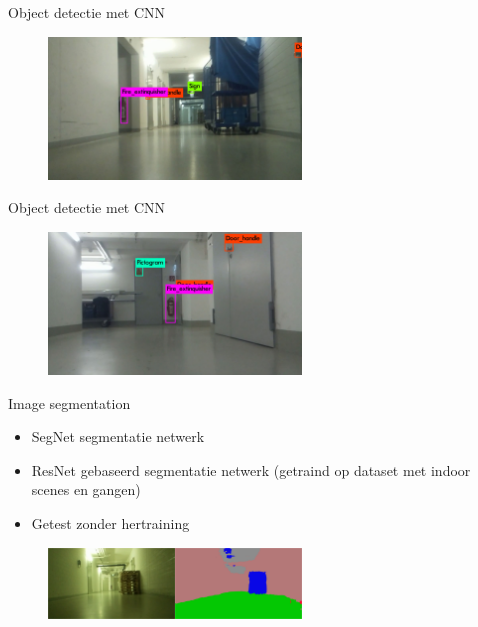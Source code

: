 \documentclass[11pt,t]{beamer}
\begin{document}
\begin{frame}[fragile]{Object detectie met CNN}
	\begin{figure}
		\centering
		\includegraphics[width=0.6\textwidth]{graphics/yolo_detectie1.jpg}
		\flushleft
	\end{figure}
\end{frame}

\begin{frame}[fragile]{Object detectie met CNN}
	\begin{figure}
		\centering
		\includegraphics[width=0.6\textwidth]{graphics/yolo_detectie2.jpg}
		\flushleft
	\end{figure}
\end{frame}

\begin{frame}[fragile]{Image segmentation}
	\begin{itemize}
		\item SegNet segmentatie netwerk
		\item ResNet gebaseerd segmentatie netwerk (getraind op dataset met indoor scenes en gangen)
		\item Getest zonder hertraining
	\end{itemize}

	\begin{figure}
		\centering
		\includegraphics[width=0.6\textwidth]{graphics/resnet_segmentatie.png}
		\flushleft
	\end{figure}
\end{frame}
\end{document}
